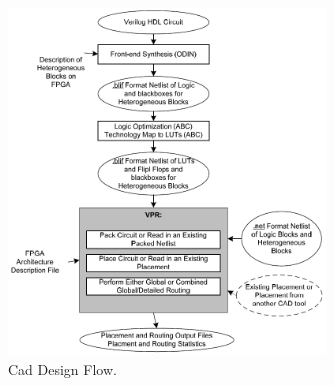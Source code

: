 \documentclass[12pt,final,oneside]{dwThesis} %
\begin{document}
   \begin{figure}

      \begin{center}

         \includegraphics[width=0.75\textwidth]{images/vpr-cad.png}
         \caption{Cad Design Flow.\cite{VPRManual}} \label{CADFlow}

      \end{center}

   \end{figure}
\end{document}
